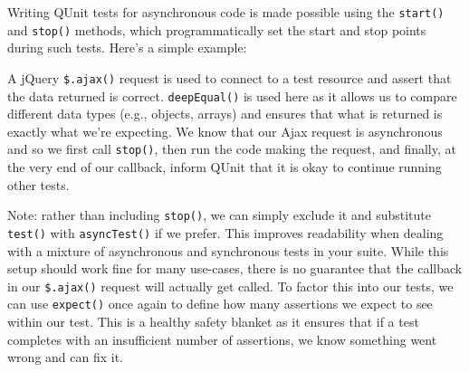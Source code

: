 \documentclass[9pt]{book}
\newenvironment{Shaded}{}{}
\newcommand{\KeywordTok}[1]{\textcolor[rgb]{0.00,0.44,0.13}{\textbf{{#1}}}}
\newcommand{\DataTypeTok}[1]{\textcolor[rgb]{0.56,0.13,0.00}{{#1}}}
\newcommand{\DecValTok}[1]{\textcolor[rgb]{0.25,0.63,0.44}{{#1}}}
\newcommand{\StringTok}[1]{\textcolor[rgb]{0.25,0.44,0.63}{{#1}}}
\newcommand{\OtherTok}[1]{\textcolor[rgb]{0.00,0.44,0.13}{{#1}}}
\newcommand{\FunctionTok}[1]{\textcolor[rgb]{0.02,0.16,0.49}{{#1}}}
\newcommand{\NormalTok}[1]{{#1}}
\begin{document}
Writing QUnit tests for asynchronous code is made possible using the
\texttt{start()} and \texttt{stop()} methods, which programmatically set
the start and stop points during such tests. Here's a simple example:

\begin{Shaded}
\end{Shaded}

A jQuery \texttt{\$.ajax()} request is used to connect to a test
resource and assert that the data returned is correct.
\texttt{deepEqual()} is used here as it allows us to compare different
data types (e.g., objects, arrays) and ensures that what is returned is
exactly what we're expecting. We know that our Ajax request is
asynchronous and so we first call \texttt{stop()}, then run the code
making the request, and finally, at the very end of our callback, inform
QUnit that it is okay to continue running other tests.

Note: rather than including \texttt{stop()}, we can simply exclude it
and substitute \texttt{test()} with \texttt{asyncTest()} if we prefer.
This improves readability when dealing with a mixture of asynchronous
and synchronous tests in your suite. While this setup should work fine
for many use-cases, there is no guarantee that the callback in our
\texttt{\$.ajax()} request will actually get called. To factor this into
our tests, we can use \texttt{expect()} once again to define how many
assertions we expect to see within our test. This is a healthy safety
blanket as it ensures that if a test completes with an insufficient
number of assertions, we know something went wrong and can fix it.
\end{document}
